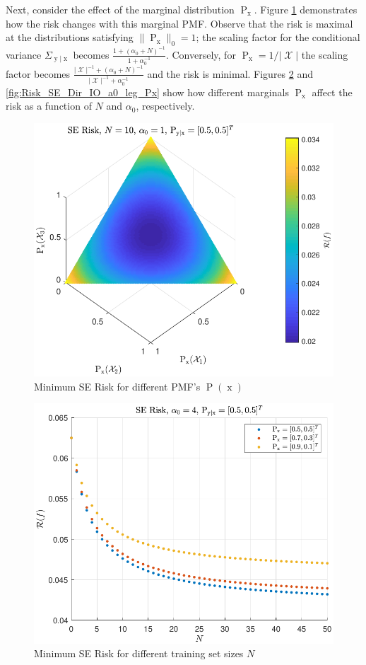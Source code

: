 \documentclass[12pt]{article}
\DeclareMathOperator{\xrm}{\mathrm{x}}
\DeclareMathOperator{\yrm}{\mathrm{y}}
\DeclareMathOperator{\Prm}{\mathrm{P}}
\DeclareMathOperator{\Xcal}{\mathcal{X}}
\begin{document}
Next, consider the effect of the marginal distribution $\Prm_{\xrm}$. Figure \ref{fig:Risk_SE_Dir_IO_Px_N_10_a0_1} demonstrates how the risk changes with this marginal PMF. Observe that the risk is maximal at the distributions satisfying $\| \Prm_{\xrm} \|_0 = 1$; the scaling factor for the conditional variance $\Sigma_{\yrm | \xrm}$ becomes $\frac{1 + (\alpha_0+N)^{-1}}{1 + \alpha_0^{-1}}$. Conversely, for $\Prm_{\xrm} = 1/|\Xcal|$ the scaling factor becomes $\frac{|\Xcal|^{-1} + (\alpha_0+N)^{-1}}{|\Xcal|^{-1} + \alpha_0^{-1}}$ and the risk is minimal. Figures \ref{fig:Risk_SE_Dir_IO_N_leg_Px} and \ref{fig:Risk_SE_Dir_IO_a0_leg_Px} show how different marginals $\Prm_{\xrm}$ affect the risk as a function of $N$ and $\alpha_0$, respectively.

\begin{figure}
\centering
\includegraphics[width=0.7\linewidth]{Risk_SE_Dir_IO_Px_N_10_a0_1.pdf}
\caption{Minimum SE Risk for different PMF's $\Prm(\xrm)$}
\label{fig:Risk_SE_Dir_IO_Px_N_10_a0_1}
\end{figure}

\begin{figure}
\centering
\includegraphics[width=0.7\linewidth]{Risk_SE_Dir_IO_N_leg_Px.pdf}
\caption{Minimum SE Risk for different training set sizes $N$}
\label{fig:Risk_SE_Dir_IO_N_leg_Px}
\end{figure}
\end{document}
